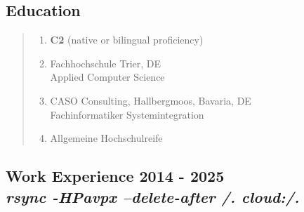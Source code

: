 \documentclass[a4paper]{report}
\begin{document}
\begin{flushleft}
\subsection*{Education}
\end{flushleft}

\begin{quote}
\begin{enumerate}

\item[English, German]
                    \textbf{C2} (native or bilingual proficiency)

\item[2004 - 2007]  Fachhochschule Trier, DE\\
                    Applied Computer Science

\item[1997 - 1999]  CASO Consulting, Hallbergmoos, Bavaria, DE\\
                    Fachinformatiker Systemintegration

\item[1996]         Allgemeine Hochschulreife

\end{enumerate}
\end{quote}

\clearpage

\begin{flushleft}
\section*{Work Experience 2014 - 2025 \\ \textit{rsync -HPavpx --delete-after /. cloud:/.}}
\end{flushleft}
\end{document}
